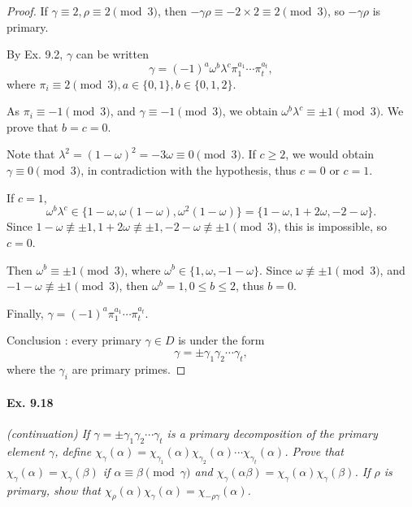 \documentclass[11pt,a4paper]{article}
\begin{document}
\begin{proof}
If $\gamma \equiv 2, \rho \equiv 2 \pmod 3$, then $-\gamma \rho \equiv -2 \times 2 \equiv 2 \pmod 3$, so $-\gamma \rho$ is primary.

\bigskip

By Ex. 9.2, $\gamma$ can be  written 
$$\gamma = (-1)^a \omega^b \lambda^c \pi_1^{a_1}\cdots \pi_t^{a_t},$$
where $\pi_i \equiv 2 \pmod 3, a \in \{0,1\}, b \in \{0,1,2\}$.

As $\pi_i \equiv -1 \pmod 3$, and $\gamma \equiv -1 \pmod 3$, we obtain $\omega^b \lambda^c \equiv \pm 1 \pmod 3$. We prove that $b = c = 0$.

Note that $\lambda^2 = (1-\omega)^2 = -3\omega \equiv 0 \pmod 3$. If $c \geq 2$, we would obtain $\gamma \equiv 0 \pmod 3$, in contradiction with the hypothesis, thus $c = 0$ or $c = 1$.

If $c=1$, $$\omega^b\lambda^c \in \{1-\omega, \omega(1-\omega),\omega^2(1-\omega)\} = \{1 - \omega, 1+2\omega, - 2 - \omega\}.$$ Since $1-\omega \not \equiv \pm 1, 1+2\omega \not \equiv \pm 1, - 2 - \omega \not \equiv \pm 1 \pmod 3$, this is impossible, so $c=0$.

Then $\omega^b \equiv \pm 1 \pmod 3$, where $\omega^b \in \{1,\omega, -1-\omega\}$. Since $\omega \not \equiv \pm1 \pmod 3$, and $-1 - \omega \not \equiv \pm 1 \pmod 3$, then $\omega^b = 1, 0 \leq b \leq 2$, thus $b=0$.

Finally, $\gamma = (-1)^a \pi_1^{a_1}\cdots \pi_t^{a_t}$.

Conclusion : every primary $\gamma \in D$ is under the form
$$\gamma = \pm \gamma_1\gamma_2\cdots \gamma_t,$$
where the $\gamma_i$ are primary primes.
\end{proof}

\paragraph{Ex. 9.18}

{\it (continuation) If $\gamma = \pm \gamma_1 \gamma_2\cdots \gamma_t$ is a primary decomposition of the primary element $\gamma$, define $\chi_{\gamma}(\alpha) = \chi_{\gamma_1}(\alpha)\chi_{\gamma_2}(\alpha)\cdots\chi_{\gamma_t}(\alpha)$. Prove that $\chi_{\gamma}(\alpha) = \chi_{\gamma}(\beta)$ if $\alpha \equiv \beta \pmod \gamma$ and $\chi_{\gamma}(\alpha \beta) = \chi_\gamma(\alpha) \chi_\gamma(\beta)$. If $\rho$ is primary, show that $\chi_\rho(\alpha) \chi_\gamma(\alpha) = \chi_{-\rho \gamma}(\alpha)$.
}
\end{document}
